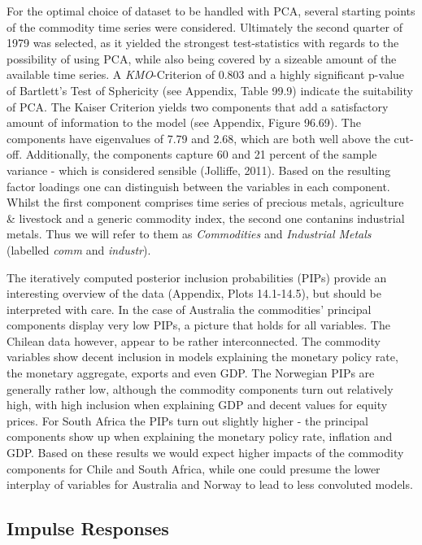 \documentclass[12pt,]{article}
\begin{document}
For the optimal choice of dataset to be handled with PCA, several
starting points of the commodity time series were considered. Ultimately
the second quarter of 1979 was selected, as it yielded the strongest
test-statistics with regards to the possibility of using PCA, while also
being covered by a sizeable amount of the available time series. A
\emph{KMO}-Criterion of 0.803 and a highly significant p-value of
Bartlett's Test of Sphericity (see Appendix, Table 99.9) indicate the
suitability of PCA. The Kaiser Criterion yields two components that add
a satisfactory amount of information to the model (see Appendix, Figure
96.69). The components have eigenvalues of 7.79 and 2.68, which are both
well above the cut-off. Additionally, the components capture 60 and 21
percent of the sample variance - which is considered sensible (Jolliffe,
2011). Based on the resulting factor loadings one can distinguish
between the variables in each component. Whilst the first component
comprises time series of precious metals, agriculture \& livestock and a
generic commodity index, the second one contanins industrial metals.
Thus we will refer to them as \emph{Commodities} and \emph{Industrial
Metals} (labelled \emph{comm} and \emph{industr}).

The iteratively computed posterior inclusion probabilities (PIPs)
provide an interesting overview of the data (Appendix, Plots 14.1-14.5),
but should be interpreted with care. In the case of Australia the
commodities' principal components display very low PIPs, a picture that
holds for all variables. The Chilean data however, appear to be rather
interconnected. The commodity variables show decent inclusion in models
explaining the monetary policy rate, the monetary aggregate, exports and
even GDP. The Norwegian PIPs are generally rather low, although the
commodity components turn out relatively high, with high inclusion when
explaining GDP and decent values for equity prices. For South Africa the
PIPs turn out slightly higher - the principal components show up when
explaining the monetary policy rate, inflation and GDP. Based on these
results we would expect higher impacts of the commodity components for
Chile and South Africa, while one could presume the lower interplay of
variables for Australia and Norway to lead to less convoluted models.

\subsection{Impulse Responses}\label{impulse-responses}
\end{document}
